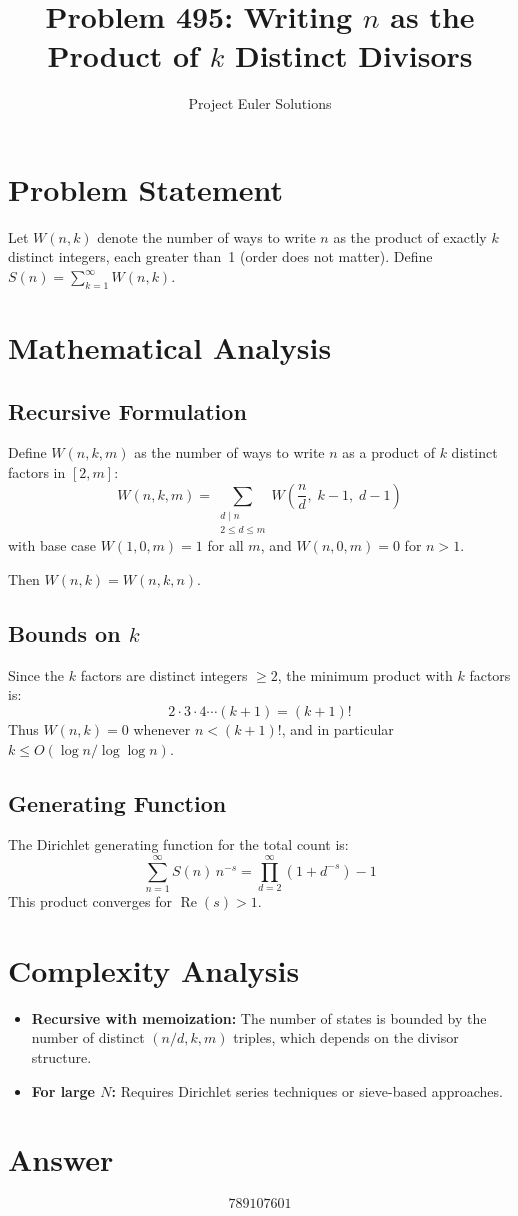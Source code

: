 \documentclass[11pt]{article}
\title{Problem 495: Writing $n$ as the Product of $k$ Distinct Divisors}
\author{Project Euler Solutions}
\date{}
\begin{document}
\maketitle

\section{Problem Statement}
Let $W(n, k)$ denote the number of ways to write $n$ as the product of exactly $k$ distinct integers, each greater than~1 (order does not matter). Define $S(n) = \sum_{k=1}^{\infty} W(n, k)$.

\section{Mathematical Analysis}
\subsection{Recursive Formulation}
Define $W(n, k, m)$ as the number of ways to write $n$ as a product of $k$ distinct factors in $[2, m]$:
\[
W(n, k, m) = \sum_{\substack{d \mid n \\ 2 \le d \le m}} W\!\left(\frac{n}{d},\; k-1,\; d-1\right)
\]
with base case $W(1, 0, m) = 1$ for all $m$, and $W(n, 0, m) = 0$ for $n > 1$.

Then $W(n, k) = W(n, k, n)$.

\subsection{Bounds on $k$}
Since the $k$ factors are distinct integers $\ge 2$, the minimum product with $k$ factors is:
\[
2 \cdot 3 \cdot 4 \cdots (k+1) = (k+1)!
\]
Thus $W(n, k) = 0$ whenever $n < (k+1)!$, and in particular $k \le O(\log n / \log\log n)$.

\subsection{Generating Function}
The Dirichlet generating function for the total count is:
\[
\sum_{n=1}^{\infty} S(n)\, n^{-s} = \prod_{d=2}^{\infty} (1 + d^{-s}) - 1
\]
This product converges for $\operatorname{Re}(s) > 1$.

\section{Complexity Analysis}
\begin{itemize}
    \item \textbf{Recursive with memoization:} The number of states is bounded by the number of distinct $(n/d, k, m)$ triples, which depends on the divisor structure.
    \item \textbf{For large $N$:} Requires Dirichlet series techniques or sieve-based approaches.
\end{itemize}

\section{Answer}

\[
\boxed{789107601}
\]
\end{document}
